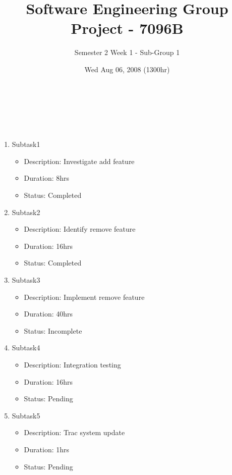 \documentclass[10pt, a4]{article}
\begin{document}
 
\title{Software Engineering Group Project - 7096B}
\author{Semester 2 Week 1 - Sub-Group 1}
\date{Wed Aug 06, 2008 (1300hr)}
 
\maketitle 
 

\\
 
\paragraph{}

\\

\begin{enumerate}
\item {Subtask1}
  \begin{itemize}
  \item Description: Investigate add feature
  \item Duration: 8hrs
  \item Status: Completed
  \end{itemize}
\item {Subtask2}
  \begin{itemize}
  \item Description: Identify remove feature
  \item Duration: 16hrs
  \item Status: Completed
  \end{itemize}
\item {Subtask3}
  \begin{itemize}
  \item Description: Implement remove feature
  \item Duration: 40hrs
  \item Status: Incomplete
  \end{itemize}
\item {Subtask4}
  \begin{itemize}
  \item Description: Integration testing
  \item Duration: 16hrs
  \item Status: Pending
  \end{itemize}
\item {Subtask5}
  \begin{itemize}
  \item Description: Trac system update
  \item Duration: 1hrs
  \item Status: Pending
  \end{itemize}
\end{enumerate}
\end{document}
